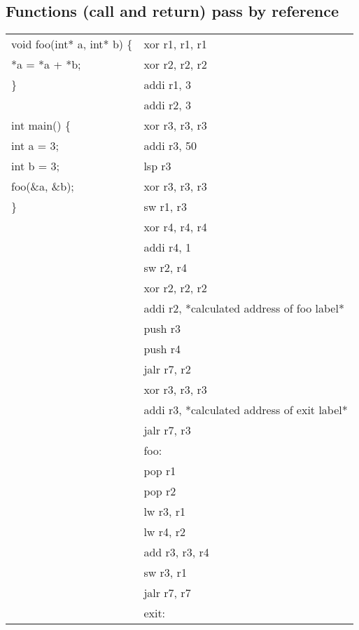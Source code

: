 \documentclass{article}
\begin{document}
\begin{par}
	\subsection{Functions (call and return) pass by reference}
	\begin{center}
		\begin{tabular}{|l|l|}
			\hline
			void foo(int* a, int* b) \{ & xor r1, r1, r1 \\
				*a = *a + *b; & xor r2, r2, r2 \\
			\} & addi r1, 3 \\
			& addi r2, 3 \\
			int main() \{ & xor r3, r3, r3 \\
				int a = 3; & addi r3, 50 \\
				int b = 3; & lsp r3 \\
				foo(\&a, \&b); & xor r3, r3, r3 \\
			\} & sw r1, r3 \\
			& xor r4, r4, r4 \\
			& addi r4, 1 \\
			& sw r2, r4 \\
			& xor r2, r2, r2 \\
			& addi r2, *calculated address of foo label* \\
			& push r3 \\
			& push r4 \\
			& jalr r7, r2 \\
			& xor r3, r3, r3 \\
			& addi r3, *calculated address of exit label* \\
			& jalr r7, r3 \\
			& foo: \\
			& pop r1 \\
			& pop r2 \\
			& lw r3, r1 \\
			& lw r4, r2 \\
			& add r3, r3, r4 \\
			& sw r3, r1 \\
			& jalr r7, r7 \\
			& exit: \\
			\hline
		\end{tabular}
	\end{center}

\end{par}
\end{document}
